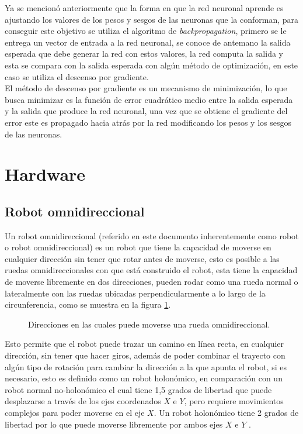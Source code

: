 \documentclass{iccmemoria}
\begin{document}
Ya se mencionó anteriormente que la forma en que la red neuronal aprende es ajustando los valores de los pesos y sesgos de las neuronas que la conforman, para conseguir este objetivo se utiliza el algoritmo de \emph{backpropagation}, primero se le entrega un vector de entrada a la red neuronal, se conoce de antemano la salida esperada que debe generar la red con estos valores, la red computa la salida y esta se compara con la salida esperada con algún método de optimización, en este caso se utiliza el descenso por gradiente.\\

El método de descenso por gradiente es un mecanismo de minimización, lo que busca minimizar es la función de error cuadrático medio entre la salida esperada y la salida que produce la red neuronal, una vez que se obtiene el gradiente del error este es propagado hacia atrás por la red modificando los pesos y los sesgos de las neuronas.

\section{Hardware}

\subsection{Robot omnidireccional}

Un robot omnidireccional (referido en este documento inherentemente como robot o robot omnidireccional) es un robot que tiene la capacidad de moverse en cualquier dirección sin tener que rotar antes de moverse, esto es posible a las ruedas omnidireccionales con que está construido el robot, esta tiene la capacidad de moverse libremente en dos direcciones, pueden rodar como una rueda normal o lateralmente con las ruedas ubicadas perpendicularmente a lo largo de la circunferencia, como se muestra en la figura \ref{fig:image_omni_whell}.\\

\begin{figure}[H]
  \centering
  
  \caption{Direcciones en las cuales puede moverse una rueda omnidireccional.}
  \label{fig:image_omni_whell}
\end{figure}


Esto permite que el robot puede trazar un camino en línea recta, en cualquier dirección, sin tener que hacer giros, además de poder combinar el trayecto con algún tipo de rotación para cambiar la dirección a la que apunta el robot, si es necesario, esto es definido como un robot holonómico, en comparación con un robot normal no-holonómico el cual tiene 1,5 grados de libertad que puede desplazarse a través de los ejes coordenados $X$ e $Y$, pero requiere movimientos complejos para poder moverse en el eje $X$. Un robot holonómico tiene 2 grados de libertad por lo que puede moverse libremente por ambos ejes $X$ e $Y$ \cite{jayakody2015omnirobot}.\\
\end{document}

